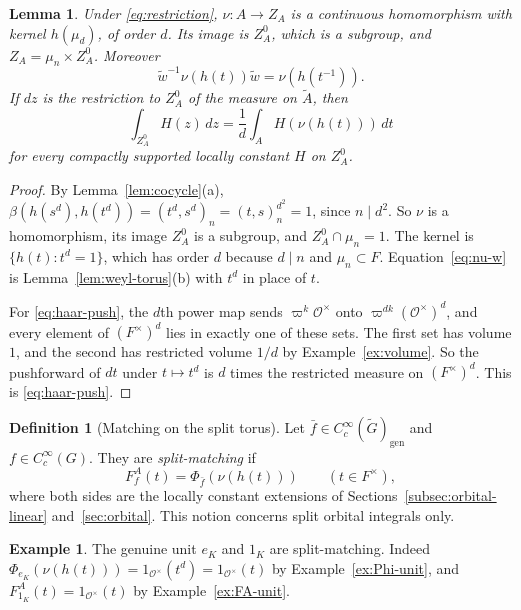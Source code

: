 \documentclass[12pt,letterpaper]{article}
\numberwithin{equation}{section}
\theoremstyle{plain}
\newtheorem{lemma}[theorem]{Lemma}
\theoremstyle{definition}
\newtheorem{definition}[theorem]{Definition}
\newtheorem{example}[theorem]{Example}
\theoremstyle{remark}
\newcommand{\Gt}{\widetilde G}
\newcommand{\At}{\widetilde A}
\newcommand{\wt}{\tilde w}
\newcommand{\Of}{\mathcal O}
\newcommand{\ZA}{Z_A}
\newcommand{\gen}{\mathrm{gen}}
\begin{document}
\begin{lemma}\label{lem:norm}
Under \eqref{eq:restriction}, $\nu:A\to\ZA$ is a continuous
homomorphism with kernel $h(\mu_d)$, of order $d$. Its image is
$\ZA^0$, which is a subgroup, and $\ZA=\mu_n\times\ZA^0$. Moreover
\begin{equation}\label{eq:nu-w}
\wt^{-1}\nu(h(t))\wt=\nu(h(t^{-1})).
\end{equation}
If $dz$ is the restriction to $\ZA^0$ of the measure on $\At$, then
\begin{equation}\label{eq:haar-push}
\int_{\ZA^0}H(z)\,dz=\frac1d\int_AH(\nu(h(t)))\,dt
\end{equation}
for every compactly supported locally constant $H$ on $\ZA^0$.
\end{lemma}

\begin{proof}
By Lemma~\ref{lem:cocycle}(a),
$\beta(h(s^d),h(t^d))=(t^d,s^d)_n=(t,s)_n^{d^2}=1$, since $n\mid d^2$.
So $\nu$ is a homomorphism, its image $\ZA^0$ is a subgroup, and
$\ZA^0\cap\mu_n=1$. The kernel is $\{h(t):t^d=1\}$, which has order
$d$ because $d\mid n$ and $\mu_n\subset F$. Equation~\eqref{eq:nu-w} is
Lemma~\ref{lem:weyl-torus}(b) with $t^d$ in place of $t$.

For \eqref{eq:haar-push}, the $d$th power map sends $\varpi^k\Of^\times$
onto $\varpi^{dk}(\Of^\times)^d$, and every element of $(F^\times)^d$
lies in exactly one of these sets. The first set has volume $1$, and
the second has restricted volume $1/d$ by Example~\ref{ex:volume}. So
the pushforward of $dt$ under $t\mapsto t^d$ is $d$ times the restricted
measure on $(F^\times)^d$. This is \eqref{eq:haar-push}.
\end{proof}

\begin{definition}[Matching on the split torus]\label{def:match}
Let $\bar f\in C_c^\infty(\Gt)_\gen$ and $f\in C_c^\infty(G)$. They are
\emph{split-matching} if
\begin{equation}\label{eq:match}
F_f^A(t)=\Phi_{\bar f}(\nu(h(t)))\qquad(t\in F^\times),
\end{equation}
where both sides are the locally constant extensions of
Sections~\ref{subsec:orbital-linear} and~\ref{sec:orbital}. This
notion concerns split orbital integrals only.
\end{definition}

\begin{example}\label{ex:units-match}
The genuine unit $e_K$ and $1_K$ are split-matching. Indeed
$\Phi_{e_K}(\nu(h(t)))=1_{\Of^\times}(t^d)=1_{\Of^\times}(t)$ by
Example~\ref{ex:Phi-unit}, and $F_{1_K}^A(t)=1_{\Of^\times}(t)$ by
Example~\ref{ex:FA-unit}.
\end{example}
\end{document}
